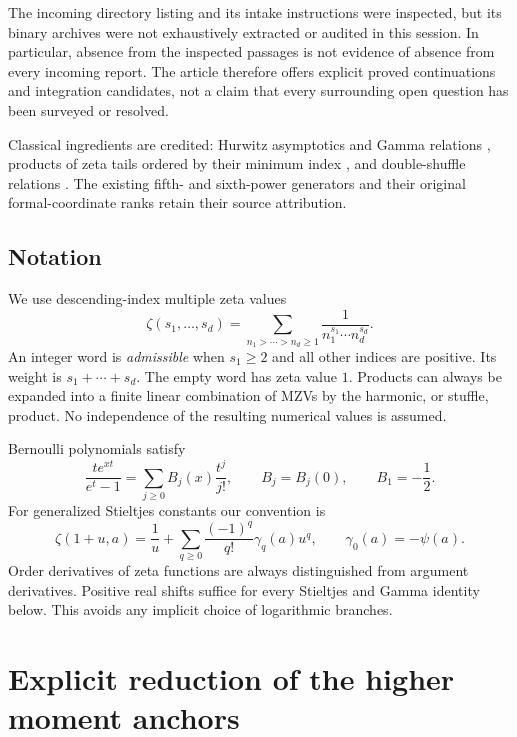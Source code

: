 \documentclass[11pt,letterpaper]{article}
\numberwithin{equation}{section}
\theoremstyle{definition}\newtheorem{definition}[theorem]{Definition}
\theoremstyle{remark}\newtheorem{remark}[theorem]{Remark}
\begin{document}
The incoming directory listing and its intake instructions were
inspected, but its binary archives were not exhaustively extracted or
audited in this session. In particular, absence from the inspected
passages is not evidence of absence from every incoming report.
The article therefore offers explicit proved continuations and
integration candidates, not a claim that every surrounding open
question has been surveyed or resolved.

Classical ingredients are credited: Hurwitz asymptotics and Gamma
relations \cite{DLMF}, products of zeta tails ordered by their minimum
index \cite{Hoffman}, and double-shuffle relations \cite{IKZ}.
The existing fifth- and sixth-power generators and their original
formal-coordinate ranks retain their source attribution.

\subsection{Notation}

We use descending-index multiple zeta values
\[
 \zeta(s_1,\ldots,s_d)
 =\sum_{n_1>\cdots>n_d\ge1}
     \frac1{n_1^{s_1}\cdots n_d^{s_d}}.
\]
An integer word is \emph{admissible} when $s_1\ge2$ and all other
indices are positive. Its weight is $s_1+\cdots+s_d$. The empty word
has zeta value $1$. Products can always be expanded into a finite
linear combination of MZVs by the harmonic, or stuffle, product.
No independence of the resulting numerical values is assumed.

Bernoulli polynomials satisfy
\[
 \frac{te^{xt}}{e^t-1}=\sum_{j\ge0}B_j(x)\frac{t^j}{j!},
 \qquad B_j=B_j(0),\qquad B_1=-\frac12.
\]
For generalized Stieltjes constants our convention is
\begin{equation}\label{eq:stieltjes-convention}
 \zeta(1+u,a)=\frac1u+
 \sum_{q\ge0}\frac{(-1)^q}{q!}\gamma_q(a)u^q,
 \qquad \gamma_0(a)=-\psi(a).
\end{equation}
Order derivatives of zeta functions are always distinguished from
argument derivatives. Positive real shifts suffice for every
Stieltjes and Gamma identity below. This avoids any implicit
choice of logarithmic branches.

\section{Explicit reduction of the higher moment anchors}
\label{sec:anchors}
\end{document}
